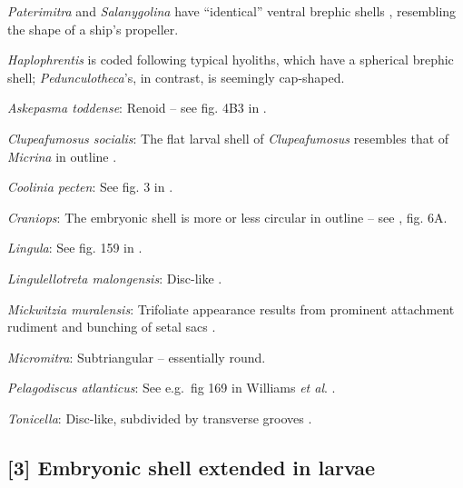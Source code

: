 \documentclass[openany]{book}
\theoremstyle{definition}
\theoremstyle{definition}
\theoremstyle{definition}
\theoremstyle{remark}
\begin{document}
\emph{Paterimitra} and \emph{Salanygolina} have ``identical'' ventral
brephic shells \citep{Holmer2011Firstrecord}, resembling the shape of a
ship's propeller.

\emph{Haplophrentis} is coded following typical hyoliths, which have a
spherical brephic shell; \emph{Pedunculotheca}'s, in contrast, is
seemingly cap-shaped.

\hypertarget{Askepasma_toddense-coding-2}{}
\emph{Askepasma toddense}: Renoid -- see fig. 4B3 in
\citet{Topper2013Theoldest}.

\hypertarget{Clupeafumosus_socialis-coding-2}{}
\emph{Clupeafumosus socialis}: The flat larval shell of
\emph{Clupeafumosus} resembles that of \emph{Micrina} in outline
\citetext{\citealp{Topper2013Reappraisalof}; \citealp[cf.][]{Holmer2011Firstrecord}}.

\hypertarget{Coolinia_pecten-coding-2}{}
\emph{Coolinia pecten}: See fig. 3 in
\citet{Bassett2017Earliestontogeny}.

\hypertarget{Craniops-coding-2}{}
\emph{Craniops}: The embryonic shell is more or less circular in outline
-- see \citet{Freeman1999Changesin}, fig. 6A.

\hypertarget{Lingula-coding-2}{}
\emph{Lingula}: See fig. 159 in \citet{Williams1997Introduction}.

\hypertarget{Lingulellotreta_malongensis-coding-2}{}
\emph{Lingulellotreta malongensis}: Disc-like \citep{Li2004}.

\hypertarget{Mickwitzia_muralensis-coding-2}{}
\emph{Mickwitzia muralensis}: Trifoliate appearance results from
prominent attachment rudiment and bunching of setal sacs
\citep{Balthasar2009Thebrachiopod}.

\hypertarget{Micromitra-coding-2}{}
\emph{Micromitra}: Subtriangular -- essentially round.

\hypertarget{Pelagodiscus_atlanticus-coding-2}{}
\emph{Pelagodiscus atlanticus}: See e.g.~fig 169 in Williams \emph{et
al}. \citeyearpar{Williams1997Introduction}.

\hypertarget{Tonicella-coding-2}{}
\emph{Tonicella}: Disc-like, subdivided by transverse grooves
\citep{Wanninger2002C}.

\subsection*{{[}3{]} Embryonic shell extended in
larvae}\label{embryonic-shell-extended-in-larvae}
\end{document}
